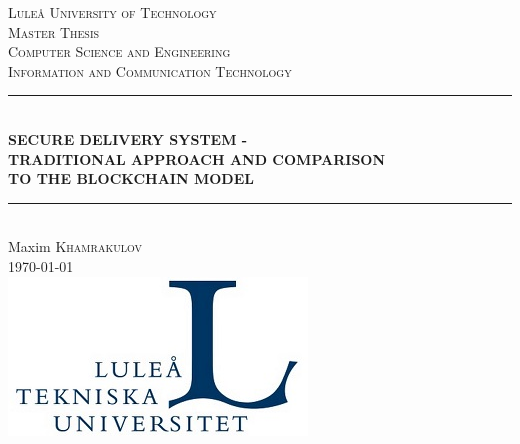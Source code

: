 \newcommand{\HRule}{\rule{\linewidth}{0.5mm}} %

\center %
 

\textsc{\LARGE Luleå University of Technology}\\[1.5cm] %
\textsc{\Large Master Thesis}\\[0.5cm] %
\textsc{\large Computer Science and Engineering}\\[0.5cm] %
\textsc{\large Information and Communication Technology}\\[0.5cm]



\HRule \\[0.4cm]
{ \large \bfseries SECURE DELIVERY SYSTEM - \\ TRADITIONAL APPROACH AND COMPARISON \\ TO THE BLOCKCHAIN MODEL}\\[0.4cm]
\HRule \\[1.5cm]
 



\large Maxim \textsc{Khamrakulov}\\[3cm] %


{\large \today}\\[2cm] %


\includegraphics[scale=0.70]{images/ltu.jpg}\\[1cm] %
 

\vfill %
